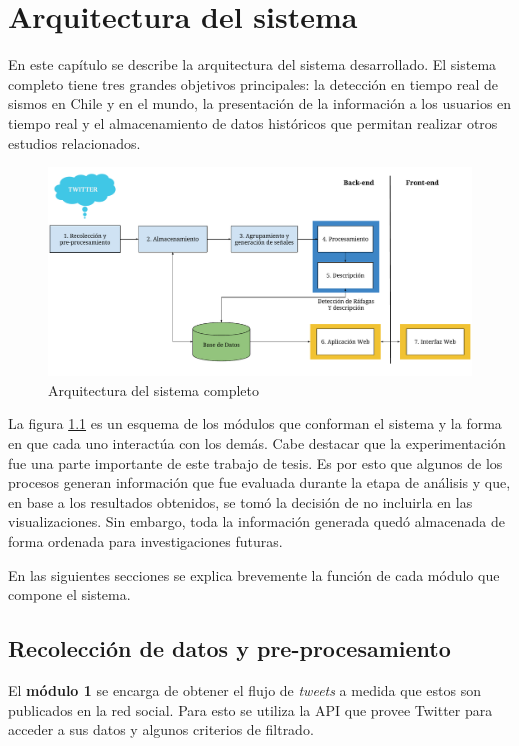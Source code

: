 \chapter{Arquitectura del sistema}
\label{cap:arquitectura}

En este capítulo se describe la arquitectura del sistema desarrollado. El sistema completo tiene tres grandes  objetivos principales: la detección en tiempo real de sismos en Chile y en el mundo, la presentación de la información a los usuarios en tiempo real y el almacenamiento de datos históricos que permitan realizar otros estudios relacionados.

\begin{figure}[h]
	\centering
	\includegraphics[width=\linewidth]{imagenes/Arquitectura.pdf}
	\caption{Arquitectura del sistema completo}
	\label{img:arquitectura}
\end{figure}

La figura \ref{img:arquitectura} es un esquema de los módulos que conforman el sistema y la forma en que cada uno interactúa con los demás. 
%
Cabe destacar que la experimentación fue una parte importante de este trabajo de tesis. Es por esto que algunos de los procesos generan información que fue evaluada durante la etapa de análisis y que, en base a los resultados obtenidos, se tomó la decisión de no incluirla en las visualizaciones. 
%
Sin embargo, toda la información generada quedó almacenada de forma ordenada para investigaciones futuras. 

En las siguientes secciones se explica brevemente la función de cada módulo que compone el sistema.

\section{Recolección de datos y pre-procesamiento}
\label{sec:recoleccion}
El \textbf{módulo 1} se encarga de obtener el flujo de \textit{tweets} a medida que estos son publicados en la red social. Para esto se utiliza la API que provee Twitter para acceder a sus datos y algunos criterios de filtrado. 

